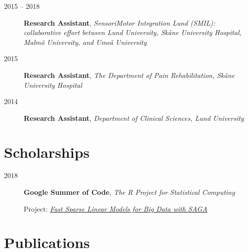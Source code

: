 \documentclass[
  10pt,
  headsepline=true,
  english,
  DIV=12
]{scrartcl}
\renewcommand*{%
  \mkbibnamegiven
}[1]{\ifitemannotation{highlight}{\textbf{#1}}{#1}}
\renewcommand*{%
  \mkbibnamefamily
}[1]{\ifitemannotation{highlight}{\textbf{#1}}{#1}}
\begin{document}
\begin{description}
  \item[2015 -- 2018] {
        \textbf{Research Assistant}, \emph{SensoriMotor Integration Lund
          (SMIL): collaborative effort between Lund University, Skåne University
          Hospital, Malmö University, and Umeå University}
        }
  \item[2015] {
        \textbf{Research Assistant}, \emph{The Department of Pain
          Rehabilitation, Skåne University Hospital}

        }
  \item[2014] {
        \textbf{Research Assistant}, \emph{Department of Clinical Sciences,
          Lund University}

        }
\end{description}

\section{Scholarships}
\begin{description}
  \item[2018] {
        \textbf{Google Summer of Code}, \emph{The R Project for Statistical
          Computing}

        Project:
        \emph{\href{https://summerofcode.withgoogle.com/archive/2018/projects/6276491595743232/}{Fast
            Sparse Linear Models for Big Data with SAGA}}
        }
\end{description}

\hypertarget{publications}{%
  \section{Publications}\label{publications}}

\nocite{*}

\printbibliography[title=Published
  Articles,heading=subbibnumbered,keyword=published-article]
\printbibliography[title=Unpublished
  Articles,heading=subbibnumbered,keyword=unpublished-article]
\printbibliography[title=Theses,heading=subbibnumbered,keyword=thesis]
\printbibliography[title=Conference
  Abstracts,heading=subbibnumbered,keyword=conference-abstract]
\end{document}
